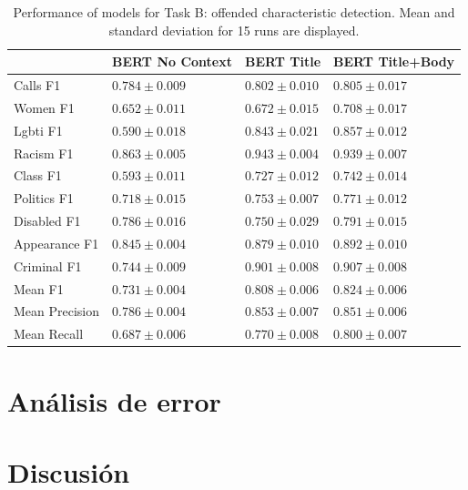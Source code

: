 \begin{table}
    \centering
    \begin{tabular}{llll}
        \toprule
        {} &    BERT No Context &         BERT Title &    BERT Title+Body \\
        \midrule
        Calls F1       &  $0.784 \pm 0.009$ &  $0.802 \pm 0.010$ &  $0.805 \pm 0.017$ \\
        Women F1       &  $0.652 \pm 0.011$ &  $0.672 \pm 0.015$ &  $0.708 \pm 0.017$ \\
        Lgbti F1       &  $0.590 \pm 0.018$ &  $0.843 \pm 0.021$ &  $0.857 \pm 0.012$ \\
        Racism F1      &  $0.863 \pm 0.005$ &  $0.943 \pm 0.004$ &  $0.939 \pm 0.007$ \\
        Class F1       &  $0.593 \pm 0.011$ &  $0.727 \pm 0.012$ &  $0.742 \pm 0.014$ \\
        Politics F1    &  $0.718 \pm 0.015$ &  $0.753 \pm 0.007$ &  $0.771 \pm 0.012$ \\
        Disabled F1    &  $0.786 \pm 0.016$ &  $0.750 \pm 0.029$ &  $0.791 \pm 0.015$ \\
        Appearance F1  &  $0.845 \pm 0.004$ &  $0.879 \pm 0.010$ &  $0.892 \pm 0.010$ \\
        Criminal F1    &  $0.744 \pm 0.009$ &  $0.901 \pm 0.008$ &  $0.907 \pm 0.008$ \\
        \hline
        Mean F1        &  $0.731 \pm 0.004$ &  $0.808 \pm 0.006$ &  $0.824 \pm 0.006$ \\
        Mean Precision &  $0.786 \pm 0.004$ &  $0.853 \pm 0.007$ &  $0.851 \pm 0.006$ \\
        Mean Recall    &  $0.687 \pm 0.006$ &  $0.770 \pm 0.008$ &  $0.800 \pm 0.007$ \\
        \bottomrule
    \end{tabular}
    \caption{Performance of models for Task B: offended characteristic detection. Mean and standard deviation for 15 runs are displayed. }
    \label{tab:task_b_results}
\end{table}


\section{Análisis de error}

\section{Discusión}

